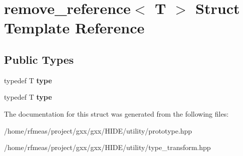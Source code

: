 \hypertarget{structremove__reference}{}\section{remove\+\_\+reference$<$ T $>$ Struct Template Reference}
\label{structremove__reference}
\subsection*{Public Types}
\begin{DoxyCompactItemize}
\item 
typedef T {\bfseries type}\hypertarget{structremove__reference_a30f490ee1919861a173b5b68c4921ea5}{}\label{structremove__reference_a30f490ee1919861a173b5b68c4921ea5}

\item 
typedef T {\bfseries type}\hypertarget{structremove__reference_a30f490ee1919861a173b5b68c4921ea5}{}\label{structremove__reference_a30f490ee1919861a173b5b68c4921ea5}

\end{DoxyCompactItemize}


The documentation for this struct was generated from the following files\+:\begin{DoxyCompactItemize}
\item 
/home/rfmeas/project/gxx/gxx/\+H\+I\+D\+E/utility/prototype.\+hpp\item 
/home/rfmeas/project/gxx/gxx/\+H\+I\+D\+E/utility/type\+\_\+transform.\+hpp\end{DoxyCompactItemize}
